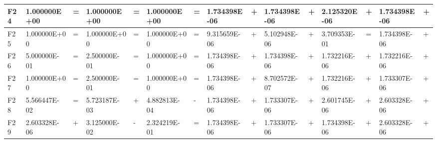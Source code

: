 \documentclass{article} %
\begin{document}
\begin{tabular}{|p{0.3in}|p{0.5in}|p{0.1in}|p{0.5in}|p{0.1in}|p{0.5in}|p{0.1in}|p{0.5in}|p{0.1in}|p{0.5in}|p{0.2in}|p{0.5in}|p{0.1in}|p{0.5in}|p{0.1in}|}
F24 & 1.000000E+00 & = & 1.000000E+00 & = & 1.000000E+00 & = & 1.734398E-06 & + & 1.734398E-06 & + & 2.125320E-06 & + & 1.734398E-06 & + \\ \hline 
F25 & 1.000000E+00 & = & 1.000000E+00 & = & 1.000000E+00 & = & 9.315659E-06 & + & 5.102948E-06 & + & 3.709353E-01 & = & 1.734398E-06 & + \\ \hline 
F26 & 5.000000E-01 & = & 2.500000E-01 & = & 1.000000E+00 & = & 1.734398E-06 & + & 1.734398E-06 & + & 1.732216E-06 & + & 1.732216E-06 & + \\ \hline 
F27 & 1.000000E+00 & = & 2.500000E-01 & = & 1.000000E+00 & = & 1.734398E-06 & + & 8.702572E-07 & + & 1.732216E-06 & + & 1.733307E-06 & + \\ \hline 
F28 & 5.566447E-02 & = & 5.723187E-03 & + & 4.882813E-04 & - & 1.734398E-06 & + & 1.733307E-06 & + & 2.601745E-06 & + & 2.603328E-06 & + \\ \hline 
F29 & 2.603328E-06 & + & 3.125000E-02 & - & 2.324219E-01 & = & 1.734398E-06 & + & 1.733307E-06 & + & 1.734398E-06 & + & 2.603328E-06 & + \\ \hline 
\end{tabular}
\end{document}

